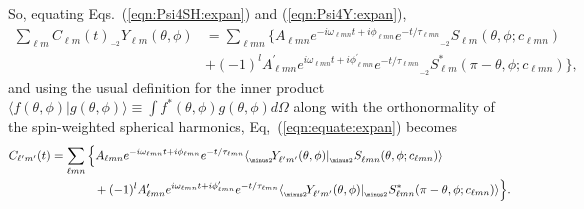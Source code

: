 \documentclass[11pt]{article}
\newcommand{\braket}[2]{\langle #1|#2\rangle}
\newcommand{\swY}[4][]{{}_{{}_{#2}}\!Y^{#1}_{#3}(#4)}
\newcommand{\swSH}[5][]{{}_{{}_{#2}}S^{#1}_{#3}(#4;#5)}
\begin{document}
So, equating Eqs.~(\ref{eqn:Psi4SH:expan}) and (\ref{eqn:Psi4Y:expan}), 
\begin{equation} \label{eqn:equate:expan}
\begin{aligned}
\sum_{\ell{m}} C_{\ell{m}}(t) \swY{\minus 2}{\ell{m}}{\theta,\phi} & = \sum_{\ell{m}n} \Big\{ A_{\ell{m}n} e^{-i\omega_{\ell{m}n}t+i\phi_{\ell{m}n}}e^{-t/\tau_{\ell{m}n}} \swSH{\minus 2}{\ell{m}}{\theta,\phi}{c_{\ell{m}n}}\\
& + (-1)^l A^\prime_{\ell{m}n} e^{i\omega_{\ell{m}n}t+i\phi^\prime_{\ell{m}n}}e^{-t/\tau_{\ell{m}n}} \swSH[*]{\minus 2}{\ell{m}}{\pi-\theta,\phi}{c_{\ell{m}n}} \Big\},
\end{aligned}
\end{equation}
and using the usual definition for the inner product $\braket{f(\theta, \phi)}{g(\theta, \phi)} \equiv \int{f^{*}(\theta, \phi) g(\theta, \phi) d\Omega}$ along with the orthonormality of the spin-weighted spherical harmonics, Eq,~(\ref{eqn:equate:expan}) becomes
\begin{equation} \label{clm:eq2}
\begin{aligned}
C_{\ell^\prime{m^\prime}}(t) &= \sum_{\ell{m}n} \Big\{ 
   A_{\ell{m}n} e^{-i\omega_{\ell{m}n}t+i\phi_{\ell{m}n}}e^{-t/\tau_{\ell{m}n}} 
   \braket{\swY{\minus 2}{\ell^\prime{m^\prime}}{\theta,\phi}}{\swSH{\minus 2}{\ell{m}n}{\theta,\phi}{c_{\ell{m}n}}} \\
& {}\hspace{0.5in} 
  + (-1)^l A^\prime_{\ell{m}n} e^{i\omega_{\ell{m}n}t+i\phi^\prime_{\ell{m}n}}e^{-t/\tau_{\ell{m}n}} 
   \braket{\swY{\minus 2}{\ell^\prime{m^\prime}}{\theta,\phi}}{\swSH[*]{\minus 2}{\ell{m}n}{\pi-\theta,\phi}{c_{\ell{m}n}}} \Big\}.
\end{aligned}
\end{equation}
\end{document}
